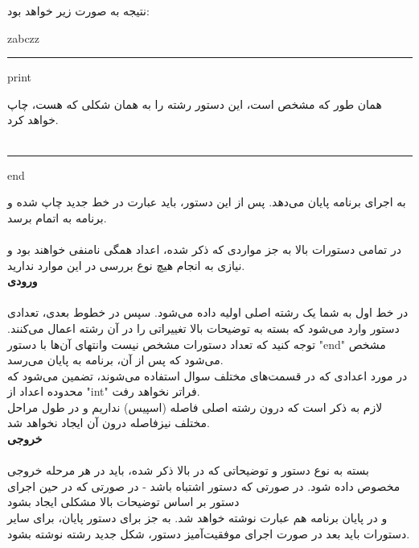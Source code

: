 \documentclass[]{article}
\begin{document}
نتیجه به صورت زیر خواهد بود:
\begin{tcolorbox}[boxrule=0pt]
	\begin{latin}
  	  \large{
  	  	zabczz
		}
	\end{latin}
\end{tcolorbox}
\noindent\rule[0.5ex]{\linewidth}{1pt}
\begin{tcolorbox}[boxrule=0pt]
	\begin{latin}
  	  \large{
  	  	print
		}
	\end{latin}
\end{tcolorbox}
همان طور که مشخص است، این دستور رشته را به همان شکلی که هست، چاپ خواهد کرد.\\\\
\noindent\rule[0.5ex]{\linewidth}{1pt}
\begin{tcolorbox}[boxrule=0pt]
	\begin{latin}
  	  \large{
  	  	end
		}
	\end{latin}
\end{tcolorbox}
به اجرای برنامه پایان می‌دهد. پس از این دستور، باید عبارت
  در خط جدید چاپ شده و برنامه به اتمام برسد.\\\\
در تمامی دستورات بالا به جز مواردی که ذکر شده، اعداد همگی نامنفی خواهند بود و نیازی به انجام هیچ نوع بررسی در این موارد ندارید.\\

\textbf{ورودی}\\\\
در خط اول به شما یک رشته اصلی اولیه داده می‌شود. سپس در خطوط بعدی، تعدادی دستور وارد می‌شود که بسته به توضیحات بالا تغییراتی را در آن رشته اعمال می‌کنند. توجه کنید که تعداد دستورات مشخص نیست وانتهای آن‌ها با دستور "end" مشخص می‌شود که پس از آن، برنامه به پایان می‌رسد.\\
در مورد اعدادی که در قسمت‌های مختلف سوال استفاده می‌شوند، تضمین می‌شود که محدوده اعداد از "int" فراتر نخواهد رفت.\\
لازم به ذکر است که درون رشته اصلی فاصله (اسپیس) نداریم و در طول مراحل مختلف نیزفاصله درون آن ایجاد نخواهد شد.\\


\textbf{خروجی}\\\\
بسته به نوع دستور و توضیحاتی که در بالا ذکر شده، باید در هر مرحله خروجی مخصوص داده شود. در صورتی که دستور اشتباه باشد 
- در صورتی که در حین اجرای دستور بر اساس توضیحات بالا مشکلی ایجاد بشود 
\\ 
و در پایان برنامه هم عبارت
 نوشته خواهد شد. به جز برای دستور پایان، برای سایر دستورات باید بعد در صورت اجرای موفقیت‌آمیز دستور، شکل جدید رشته نوشته بشود.\\
\end{document}
